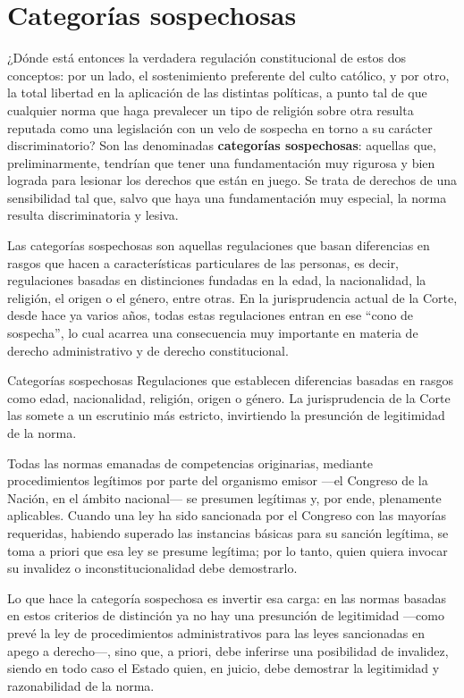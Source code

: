 \documentclass[12pt,oneside]{book}
\begin{document}
\section{Categorías sospechosas}

¿Dónde está entonces la verdadera regulación constitucional de estos dos conceptos: por un lado, el sostenimiento preferente del culto católico, y por otro, la total libertad en la aplicación de las distintas políticas, a punto tal de que cualquier norma que haga prevalecer un tipo de religión sobre otra resulta reputada como una legislación con un velo de sospecha en torno a su carácter discriminatorio? Son las denominadas \textbf{categorías sospechosas}: aquellas que, preliminarmente, tendrían que tener una fundamentación muy rigurosa y bien lograda para lesionar los derechos que están en juego. Se trata de derechos de una sensibilidad tal que, salvo que haya una fundamentación muy especial, la norma resulta discriminatoria y lesiva.

Las categorías sospechosas son aquellas regulaciones que basan diferencias en rasgos que hacen a características particulares de las personas, es decir, regulaciones basadas en distinciones fundadas en la edad, la nacionalidad, la religión, el origen o el género, entre otras. En la jurisprudencia actual de la Corte, desde hace ya varios años, todas estas regulaciones entran en ese ``cono de sospecha'', lo cual acarrea una consecuencia muy importante en materia de derecho administrativo y de derecho constitucional.

\begin{definition}{Categorías sospechosas}
Regulaciones que establecen diferencias basadas en rasgos como edad, nacionalidad, religión, origen o género. La jurisprudencia de la Corte las somete a un escrutinio más estricto, invirtiendo la presunción de legitimidad de la norma.
\end{definition}

Todas las normas emanadas de competencias originarias, mediante procedimientos legítimos por parte del organismo emisor —el Congreso de la Nación, en el ámbito nacional— se presumen legítimas y, por ende, plenamente aplicables. Cuando una ley ha sido sancionada por el Congreso con las mayorías requeridas, habiendo superado las instancias básicas para su sanción legítima, se toma a priori que esa ley se presume legítima; por lo tanto, quien quiera invocar su invalidez o inconstitucionalidad debe demostrarlo.

Lo que hace la categoría sospechosa es invertir esa carga: en las normas basadas en estos criterios de distinción ya no hay una presunción de legitimidad —como prevé la ley de procedimientos administrativos para las leyes sancionadas en apego a derecho—, sino que, a priori, debe inferirse una posibilidad de invalidez, siendo en todo caso el Estado quien, en juicio, debe demostrar la legitimidad y razonabilidad de la norma.
\end{document}
